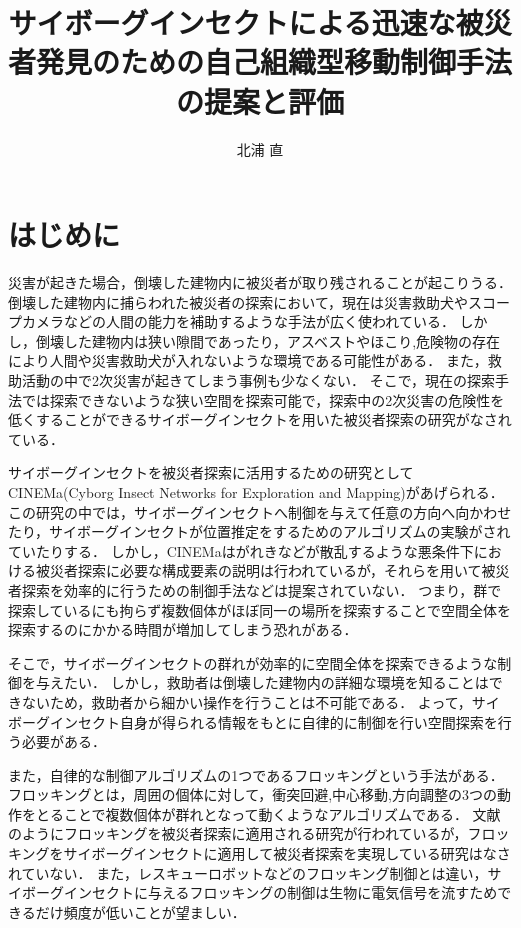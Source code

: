 \documentclass[a4paper,11pt]{jarticle}
\title{サイボーグインセクトによる迅速な被災者発見のための自己組織型移動制御手法の提案と評価}
\author{北浦 直}
\begin{document}
	\titlepage    %
	\abstract     %
	\keyword
	\tableofcontents    %
	\section{はじめに}
	災害が起きた場合，倒壊した建物内に被災者が取り残されることが起こりうる．
	倒壊した建物内に捕らわれた被災者の探索において，現在は災害救助犬やスコープカメラなどの人間の能力を補助するような手法が広く使われている\cite{USR}．
	しかし，倒壊した建物内は狭い隙間であったり，アスベストやほこり,危険物の存在により人間や災害救助犬が入れないような環境である可能性がある\cite{environment}．
	また，救助活動の中で2次災害が起きてしまう事例も少なくない．
	そこで，現在の探索手法では探索できないような狭い空間を探索可能で，探索中の2次災害の危険性を低くすることができるサイボーグインセクトを用いた被災者探索の研究がなされている\cite{CyborgInsect}．

	サイボーグインセクトを被災者探索に活用するための研究としてCINEMa(Cyborg Insect Networks for Exploration and Mapping)があげられる\cite{CINEMa}．
	この研究の中では，サイボーグインセクトへ制御を与えて任意の方向へ向かわせたり，サイボーグインセクトが位置推定をするためのアルゴリズムの実験がされていたりする．
	しかし，CINEMaはがれきなどが散乱するような悪条件下における被災者探索に必要な構成要素の説明は行われているが，それらを用いて被災者探索を効率的に行うための制御手法などは提案されていない．
	つまり，群で探索しているにも拘らず複数個体がほぼ同一の場所を探索することで空間全体を探索するのにかかる時間が増加してしまう恐れがある．
	
	そこで，サイボーグインセクトの群れが効率的に空間全体を探索できるような制御を与えたい．
	しかし，救助者は倒壊した建物内の詳細な環境を知ることはできないため，救助者から細かい操作を行うことは不可能である．
	よって，サイボーグインセクト自身が得られる情報をもとに自律的に制御を行い空間探索を行う必要がある．
		
	また，自律的な制御アルゴリズムの1つであるフロッキングという手法がある．
	フロッキングとは，周囲の個体に対して，衝突回避,中心移動,方向調整の3つの動作をとることで複数個体が群れとなって動くようなアルゴリズムである\cite{flocks}．
	文献\cite{flockingsearch}のようにフロッキングを被災者探索に適用される研究が行われているが，フロッキングをサイボーグインセクトに適用して被災者探索を実現している研究はなされていない．
	また，レスキューロボットなどのフロッキング制御とは違い，サイボーグインセクトに与えるフロッキングの制御は生物に電気信号を流すためできるだけ頻度が低いことが望ましい．
	
\end{document}
